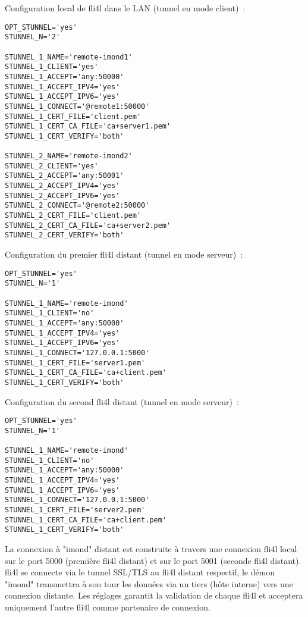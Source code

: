 Configuration local de fli4l dans le LAN (tunnel en mode client)~:

\begin{example}
\begin{verbatim}
OPT_STUNNEL='yes'
STUNNEL_N='2'

STUNNEL_1_NAME='remote-imond1'
STUNNEL_1_CLIENT='yes'
STUNNEL_1_ACCEPT='any:50000'
STUNNEL_1_ACCEPT_IPV4='yes'
STUNNEL_1_ACCEPT_IPV6='yes'
STUNNEL_1_CONNECT='@remote1:50000'
STUNNEL_1_CERT_FILE='client.pem'
STUNNEL_1_CERT_CA_FILE='ca+server1.pem'
STUNNEL_1_CERT_VERIFY='both'

STUNNEL_2_NAME='remote-imond2'
STUNNEL_2_CLIENT='yes'
STUNNEL_2_ACCEPT='any:50001'
STUNNEL_2_ACCEPT_IPV4='yes'
STUNNEL_2_ACCEPT_IPV6='yes'
STUNNEL_2_CONNECT='@remote2:50000'
STUNNEL_2_CERT_FILE='client.pem'
STUNNEL_2_CERT_CA_FILE='ca+server2.pem'
STUNNEL_2_CERT_VERIFY='both'
\end{verbatim}
\end{example}

Configuration du premier fli4l distant (tunnel en mode serveur)~:
\begin{example}
\begin{verbatim}
OPT_STUNNEL='yes'
STUNNEL_N='1'

STUNNEL_1_NAME='remote-imond'
STUNNEL_1_CLIENT='no'
STUNNEL_1_ACCEPT='any:50000'
STUNNEL_1_ACCEPT_IPV4='yes'
STUNNEL_1_ACCEPT_IPV6='yes'
STUNNEL_1_CONNECT='127.0.0.1:5000'
STUNNEL_1_CERT_FILE='server1.pem'
STUNNEL_1_CERT_CA_FILE='ca+client.pem'
STUNNEL_1_CERT_VERIFY='both'
\end{verbatim}
\end{example}

Configuration du second fli4l distant (tunnel en mode serveur)~:
\begin{example}
\begin{verbatim}
OPT_STUNNEL='yes'
STUNNEL_N='1'

STUNNEL_1_NAME='remote-imond'
STUNNEL_1_CLIENT='no'
STUNNEL_1_ACCEPT='any:50000'
STUNNEL_1_ACCEPT_IPV4='yes'
STUNNEL_1_ACCEPT_IPV6='yes'
STUNNEL_1_CONNECT='127.0.0.1:5000'
STUNNEL_1_CERT_FILE='server2.pem'
STUNNEL_1_CERT_CA_FILE='ca+client.pem'
STUNNEL_1_CERT_VERIFY='both'
\end{verbatim}
\end{example}

La connexion à "imond" distant est construite à travers une connexion fli4l local sur
le port 5000 (première fli4l distant) et sur le port 5001 (seconde fli4l distant). fli4l
se connecte via le tunnel SSL/TLS au fli4l distant respectif, le démon "imond" transmettra
à son tour les données via un tiers (hôte interne) vers une connexion distante. Les réglages
garantit la validation de chaque fli4l et acceptera uniquement l'autre fli4l comme partenaire
de connexion.
